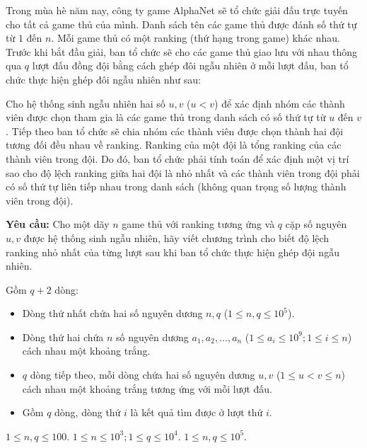 
Trong mùa hè năm nay, công ty game AlphaNet sẽ tổ chức giải đấu trực tuyến cho tất cả game thủ của mình. Danh sách tên các game thủ được đánh số thứ tự từ $1$ đến $n$. Mỗi game thủ có một ranking (thứ hạng trong game) khác nhau. Trước khi bắt đầu giải, ban tổ chức sẽ cho các game thủ giao lưu với nhau thông qua $q$ lượt đấu đồng đội bằng cách ghép đôi ngẫu nhiên ở mỗi lượt đấu, ban tổ chức thực hiện ghép đôi ngẫu nhiên như sau:

\medskip
Cho hệ thống sinh ngẫu nhiên hai số $u, v$ ($u < v$) để xác định nhóm các thành viên được chọn tham gia là các game thủ trong danh sách có số thứ tự từ $u$ đến $v$. Tiếp theo ban tổ chức sẽ chia nhóm các thành viên được chọn thành hai đội tương đối đều nhau về ranking. Ranking của một đội là tổng ranking của các thành viên trong đội. Do đó, ban tổ chức phải tính toán để xác định một vị trí sao cho độ lệch ranking giữa hai đội là nhỏ nhất và các thành viên trong đội phải có số thứ tự liên tiếp nhau trong danh sách (không quan trọng số lượng thành viên trong đội).


\medskip
\textbf{Yêu cầu:} Cho một dãy $n$ game thủ với ranking tương ứng và $q$ cặp số nguyên $u, v$ được hệ thống sinh ngẫu nhiên, hãy viết chương trình cho biết độ lệch ranking nhỏ nhất của từng lượt sau khi ban tổ chức thực hiện ghép đội ngẫu nhiên.

Gồm $q + 2$ dòng:
\begin{itemize}
    \item Dòng thứ nhất chứa hai số nguyên dương $n, q$ ($1 \le n, q \le 10^5$).
    \item Dòng thứ hai chứa $n$ số nguyên dương $a_1, a_2, \dots, a_n$ ($1 \le a_i \le 10^9; 1 \le i \le n$) cách nhau một khoảng trắng.
    \item $q$ dòng tiếp theo, mỗi dòng chứa hai số nguyên dương $u, v$ ($1 \le u < v \le n$) cách nhau một khoảng trắng tương ứng với mỗi lượt đấu.
\end{itemize}

\begin{itemize}
    \item Gồm $q$ dòng, dòng thứ $i$ là kết quả tìm được ở lượt thứ $i$.
\end{itemize}

\begin{makesubtasks}
     $1 \le n, q \le 100$.
     $1 \le n \le 10^3; 1 \le q \le 10^4$.
     $1 \le n, q \le 10^5$.
\end{makesubtasks}

